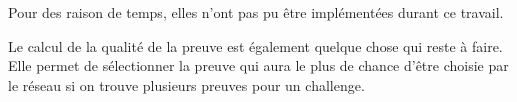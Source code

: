 Pour des raison de temps, elles n'ont pas pu être implémentées durant ce travail.

Le calcul de la qualité de la preuve est également quelque chose qui reste à faire. Elle permet de sélectionner la preuve qui aura le plus de chance d'être choisie par le réseau si on trouve plusieurs preuves pour un challenge.